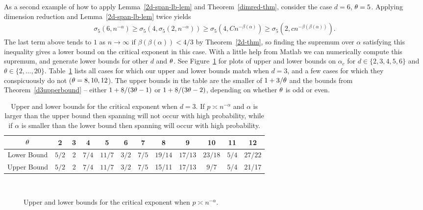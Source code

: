 As a second example of how to apply Lemma~\ref{2d-span-lb-lem} and Theorem~\ref{dimred-thm}, consider the case $d=6$, $\theta=5$.  Applying dimension reduction and Lemma~\ref{2d-span-lb-lem} twice yields
\begin{align*}
\sigma_5 ( 6,n^{-\alpha}) \geq \sigma_5(4,\sigma_5(2,n^{-\alpha})) \geq \sigma_5(4,Cn^{-\beta(\alpha)}) \geq \sigma_5(2,c n^{-\beta(\beta(\alpha))}).
\end{align*}
The last term above tends to $1$ as $n\to \infty$ if $\beta(\beta(\alpha)) < 4/3$ by Theorem~\ref{2d-thm}, so finding the supremum over $\alpha$ satisfying this inequality gives a lower bound on the critical exponent in this case.  With a little help from Matlab we can numerically compute this supremum, and generate lower bounds for other $d$ and $\theta$.  See Figure~\ref{alpha-bounds} for plots of upper and lower bounds on $\alpha_c$ for $d \in \{2,3,4,5,6\}$ and $\theta \in \{2, \ldots, 20\}$.  Table~\ref{exact-exponents} lists all cases for which our upper and lower bounds match when $d=3$, and a few cases for which they conspicuously do not ($\theta = 8,10,12$).  The upper bounds in the table are the smaller of $1+3/\theta$ and the bounds from Theorem~\ref{d3upperbound} -- either $1+8/(3\theta-1)$ or $1+8/(3\theta-2)$, depending on whether $\theta$ is odd or even.
\begin{table}
\begin{center}
\begin{tabular}{|c||c|c|c|c|c|c|c|c|c|c|c|}\hline
$\theta$ & 2 & 3 & 4 &5 & 6& 7& 8& 9& 10& 11&12 \\ \hline\hline
Lower Bound & $5/2$ & 2 & $7/4$ & $11/7$& $3/2$ & $7/5$ & $19/14$ & $17/13$ & $23/18$ &$5/4$ & $27/22$ \\ \hline
Upper Bound & $5/2$ & 2 & $7/4$ & $11/7$& $3/2$ & $7/5$ &15/11 & 17/13& 9/7 & 5/4 & 21/17\\ \hline
\end{tabular}
\end{center}
\caption{Upper and lower bounds for the critical exponent when $d=3$.  If $p\asymp n^{-\alpha}$ and $\alpha$ is larger than the upper bound then spanning will not occur with high probability, while if $\alpha$ is smaller than the lower bound then spanning will occur with high probability.}
\label{exact-exponents}
\end{table}

\begin{figure}[htd]
	\centering
	\hspace{.1in}
	\\
	\hspace{.1in}
	\caption{Upper and lower bounds for the critical exponent when $p \asymp n^{-\alpha}$.}
	\label{alpha-bounds}
\end{figure}


